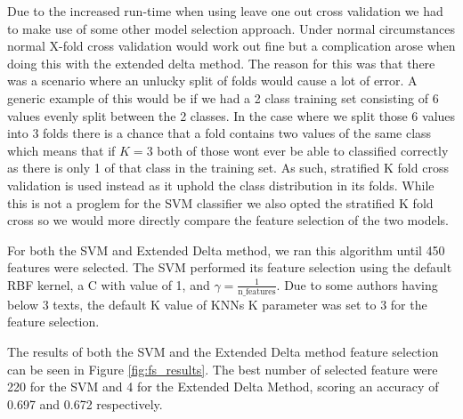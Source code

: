 Due to the increased run-time when using leave one out cross validation we had
to make use of some other model selection approach. Under normal circumstances
normal X-fold cross validation would work out fine but a complication arose when
doing this with the extended delta method. The reason for this was that there
was a scenario where an unlucky split of folds would cause a lot of error. A
generic example of this would be if we had a 2 class training set consisting
of 6 values evenly split between the 2 classes. In the case where we split
those 6 values into 3 folds there is a chance that a fold contains two values
of the same class which means that if $K = 3$ both of those wont ever be able
to classified correctly as there is only 1 of that class in the training set.
As such, stratified K fold cross validation is used instead as it uphold the
class distribution in its folds. While this is not a proglem for the \gls{SVM}
classifier we also opted the stratified K fold cross so we would more directly
compare the feature selection of the two models.

For both the \gls{SVM} and Extended Delta method, we ran this algorithm
until 450 features were selected. The \gls{SVM} performed its feature selection
using the default RBF kernel, a C with value of 1, and $\gamma =
\frac{1}{\text{n\_features}}$. Due to some authors having below 3 texts,
the default K value of \glspl{KNN} K parameter was set to 3 for the feature
selection.

The results of both the SVM and the Extended Delta method feature selection can
be seen in Figure \ref{fig:fs_results}. The best number of selected feature were
220 for the SVM and 4 for the Extended Delta Method, scoring an accuracy of
0.697 and 0.672 respectively.

